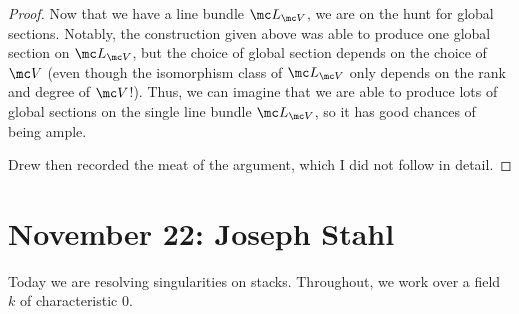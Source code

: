 \documentclass{article}
\begin{document}
\begin{proof}
    Now that we have a line bundle $\mc L_{\mc V}$, we are on the hunt for global sections. Notably, the construction given above was able to produce one global section on $\mc L_{\mc V}$, but the choice of global section depends on the choice of $\mc V$ (even though the isomorphism class of $\mc L_{\mc V}$ only depends on the rank and degree of $\mc V$!). Thus, we can imagine that we are able to produce lots of global sections on the single line bundle $\mc L_{\mc V}$, so it has good chances of being ample.
    
    Drew then recorded the meat of the argument, which I did not follow in detail.
\end{proof}

\section{November 22: Joseph Stahl}
Today we are resolving singularities on stacks. Throughout, we work over a field $k$ of characteristic $0$.
\end{document}
